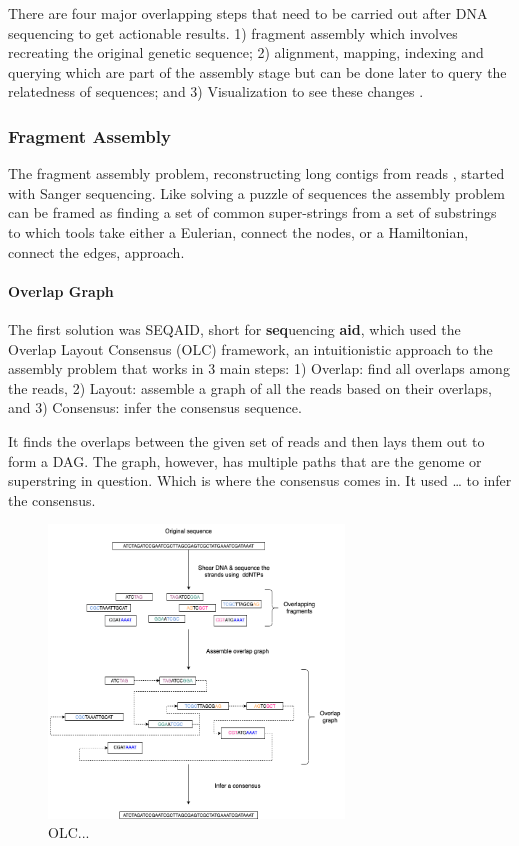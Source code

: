 \documentclass[10pt, a4paper]{article}
\begin{document}
There are four major overlapping steps that need to be carried out after DNA
sequencing to get actionable results. 1) fragment assembly which involves
recreating the original genetic sequence; 2) alignment, mapping, indexing and
querying which are part of the assembly stage but can be done later to query the
relatedness of sequences; and 3) Visualization to see these changes
\cite{flicekSenseSequenceReads2009}.

\subsubsection{Fragment Assembly}
\label{sec:orge2a0afb}
The fragment assembly problem, reconstructing long contigs from reads
\cite{chikhiCompactingBruijnGraphs2016}, started with Sanger sequencing.
Like solving a puzzle of sequences the assembly problem can be framed as finding
a set of common super-strings from a set of substrings to which tools take
either a Eulerian, connect the nodes, or a Hamiltonian, connect the edges,
approach.

\paragraph{Overlap Graph}
\label{sec:org4349796}
The first solution was SEQAID, short for \textbf{seq}uencing \textbf{aid},
\cite{peltolaSEQAIDDNASequence1984} which used the  Overlap Layout Consensus (OLC)
framework, an intuitionistic approach to the assembly problem that works in
3 main steps: 1) Overlap: find all overlaps among the reads, 2) Layout: assemble
a graph of all the reads based on their overlaps, and 3) Consensus: infer the
consensus sequence.

It finds the overlaps between the given set of reads and then lays
them out to form a DAG. The graph, however, has multiple paths that are the
genome or superstring in question. Which is where the consensus comes in.
It used … to infer the consensus.

\begin{figure}[H]
\centering
\includegraphics[width=0.7\textwidth]{./figures/OLC framework.png}
\caption{OLC...}
\end{figure}
\end{document}
